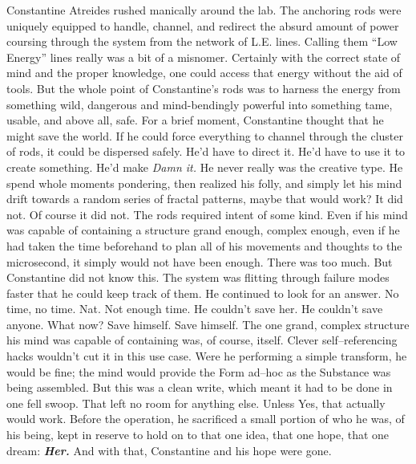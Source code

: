 Constantine Atreides rushed manically around the lab. The anchoring rods were uniquely equipped to handle, channel, and redirect the absurd amount of power coursing through the system from the network of L.E. lines. Calling them “Low Energy” lines really was a bit of a misnomer. Certainly with the correct state of mind and the proper knowledge, one could access that energy without the aid of tools. But the whole point of Constantine’s rods was to harness the energy from something wild, dangerous and mind-bendingly powerful into something tame, usable, and above all, safe.
\SmallVSpace
For a brief moment, Constantine thought that he might save the world. If he could force everything to channel through the cluster of rods, it could be dispersed safely. He’d have to direct it. He’d have to use it to create something. He’d make{\el}
\SmallVSpace
\emph{Damn it.}
\SmallVSpace
He never really was the creative type. He spend whole moments pondering, then realized his folly, and simply let his mind drift towards a random series of fractal patterns, maybe that would work?
\SomeVSpace
It did not.
\SomeVSpace
Of course it did not. The rods required intent of some kind.
\SomeVSpace
Even if his mind was capable of containing a structure grand enough, complex enough, even if he had taken the time beforehand to plan all of his movements and thoughts to the microsecond, it simply would not have been enough. There was too much. But Constantine did not know this. The system was flitting through failure modes faster that he could keep track of them. He continued to look for an answer. No time, no time.
\SomeVSpace
Nat.
\SomeVSpace
Not enough time. He couldn’t save her. He couldn’t save anyone. What now? Save himself. Save himself. The one grand, complex structure his mind was capable of containing was, of course, itself. Clever self\mbox{--}referencing hacks wouldn’t cut it in this use case. Were he performing a simple transform, he would be fine; the mind would provide the Form ad\mbox{--}hoc as the Substance was being assembled.
\SmallVSpace
But this was a clean write, which meant it had to be done in one fell swoop. That left no room for anything else. Unless{\el} Yes, that actually would work. Before the operation, he sacrificed a small portion of who he was, of his being, kept in reserve to hold on to that one idea, that one hope, that one dream:
\SmallVSpace
\textbf{\emph{Her.}}
\SomeVSpace
And with that, Constantine and his hope were gone.
\simpleline
{}

